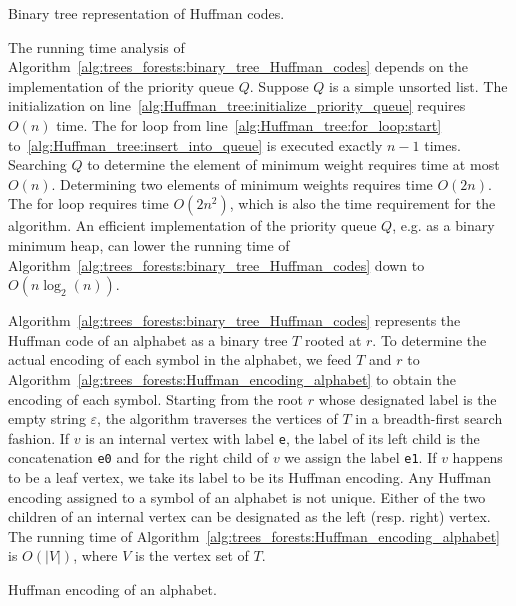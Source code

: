 \begin{algorithm}[!htpb]

\caption{Binary tree representation of Huffman codes.}
\label{alg:trees_forests:binary_tree_Huffman_codes}
\end{algorithm}

The running time analysis of
Algorithm~\ref{alg:trees_forests:binary_tree_Huffman_codes} depends on
the implementation of the priority queue $Q$. Suppose $Q$ is a simple
unsorted list. The initialization on
line~\ref{alg:Huffman_tree:initialize_priority_queue} requires $O(n)$
time. The for loop from line~\ref{alg:Huffman_tree:for_loop:start}
to~\ref{alg:Huffman_tree:insert_into_queue} is executed exactly
$n - 1$ times. Searching $Q$ to determine the element of minimum
weight requires time at most $O(n)$. Determining two elements of
minimum weights requires time $O(2n)$. The for loop requires time
$O(2n^2)$, which is also the time requirement for the algorithm. An
efficient implementation of the priority queue $Q$, e.g. as a binary
minimum heap, can lower the running time of
Algorithm~\ref{alg:trees_forests:binary_tree_Huffman_codes} down to
$O(n \log_2(n))$.

Algorithm~\ref{alg:trees_forests:binary_tree_Huffman_codes} represents
the Huffman code of an alphabet as a binary tree $T$ rooted at $r$. To
determine the actual encoding of each symbol in the alphabet, we feed
$T$ and $r$ to
Algorithm~\ref{alg:trees_forests:Huffman_encoding_alphabet} to obtain
the encoding of each symbol. Starting from the root $r$ whose
designated label is the empty string $\varepsilon$, the algorithm
traverses the vertices of $T$ in a breadth-first search fashion. If
$v$ is an internal vertex with label \verb!e!, the label of its left
child is the concatenation \verb!e0! and for the right child of $v$ we
assign the label \verb!e1!. If $v$ happens to be a leaf vertex, we
take its label to be its Huffman encoding. Any Huffman encoding
assigned to a symbol of an alphabet is not unique. Either of the two
children of an internal vertex can be designated as the left
(resp. right) vertex. The running time of
Algorithm~\ref{alg:trees_forests:Huffman_encoding_alphabet} is
$O(|V|)$, where $V$ is the vertex set of $T$.

\begin{algorithm}[!htpb]

\caption{Huffman encoding of an alphabet.}
\label{alg:trees_forests:Huffman_encoding_alphabet}
\end{algorithm}

